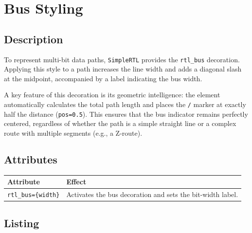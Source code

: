 \section{\sffamily Bus Styling}

    \subsection{\sffamily Description}
        To represent multi-bit data paths, \texttt{SimpleRTL} provides the \texttt{rtl\_bus} decoration. Applying this style to a path increases the line width and adds a diagonal slash at the midpoint, accompanied by a label indicating the bus width. 
        
        A key feature of this decoration is its geometric intelligence: the element automatically calculates the total path length and places the \texttt{/} marker at exactly half the distance (\texttt{pos=0.5}). This ensures that the bus indicator remains perfectly centered, regardless of whether the path is a simple straight line or a complex route with multiple segments (e.g., a Z-route).
    \subsection{\sffamily Attributes}
    \begin{center}
        \begin{tabular}{lp{8cm}}
        \toprule
            \textbf{Attribute} & \textbf{Effect} \\
            \midrule
            \texttt{rtl\_bus=\{width\}} & Activates the bus decoration and sets the bit-width label. \\
            \bottomrule
        \end{tabular}
    \end{center}

    \subsection{\sffamily Listing}
\begin{RTLexample}
\end{RTLexample}

